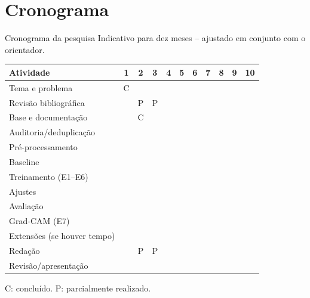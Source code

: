 \documentclass[aspectratio=169]{beamer}
\begin{document}
\section{Cronograma}
\begin{frame}{Cronograma da pesquisa}
  {\footnotesize Indicativo para dez meses -- ajustado em conjunto com o orientador.}
  \vspace{6pt}
  \begin{table}
    \centering
    \tiny
    \begin{tabular}{@{}l*{10}{c}@{}}
      \toprule
      \textbf{Atividade} & 1&2&3&4&5&6&7&8&9&10 \\
      \midrule
      Tema e problema          & \cellcolor{green!30}C &&&&&&&&& \\
      Revisão bibliográfica    & &\cellcolor{yellow!40}P&\cellcolor{yellow!40}P&&&&&&& \\
      Base e documentação      & &\cellcolor{green!30}C&&&&&&&& \\
      Auditoria/deduplicação   & &&&&&&&&& \\
      Pré-processamento        & &&&&&&&&& \\
      Baseline                 & &&&&&&&&& \\
      Treinamento (E1--E6)     & &&&&&&&&& \\
      Ajustes                  & &&&&&&&&& \\
      Avaliação                & &&&&&&&&& \\
      Grad-CAM (E7)            & &&&&&&&&& \\
      Extensões (se houver tempo) & &&&&&&&&& \\
      Redação                  & &\cellcolor{yellow!40}P&\cellcolor{yellow!40}P&&&&&&& \\
      Revisão/apresentação     & &&&&&&&&& \\
      \bottomrule
    \end{tabular}
  \end{table}
  {\footnotesize C: concluído. P: parcialmente realizado.}
\end{frame}

\end{document}
